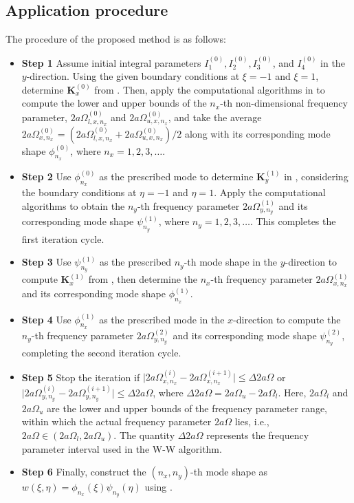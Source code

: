 \documentclass[preprint,12pt]{elsarticle}
\begin{document}
\subsection{Application procedure}\label{sec:Application procedure}
The procedure of the proposed method is as follows:   
\begin{itemize}[]
	\item \textbf{Step 1} Assume initial integral parameters $I^{(0)}_1, I^{(0)}_2, I^{(0)}_3$, and $I^{(0)}_4$ in the $y$-direction. Using the given boundary conditions at $\xi = -1$ and $\xi = 1$, determine $\mathbf{K}^{(0)}_x$ from . 
	Then, apply the computational algorithms in  to compute the lower and upper bounds of the $n_x$-th non-dimensional frequency parameter, $2a\Omega^{(0)}_{l,x,n_x}$ and $2a\Omega^{(0)}_{u,x,n_x}$, and take the average $2a\Omega^{(0)}_{x,n_x} = (2a\Omega^{(0)}_{l,x,n_x} + 2a\Omega^{(0)}_{u,x,n_x})/2$ along with its corresponding mode shape $\phi^{(0)}_{n_x}$, where $n_x = 1, 2, 3, \ldots$.
	
	\item \textbf{Step 2} Use $\phi^{(0)}_{n_x}$ as the prescribed mode to determine $\mathbf{K}^{(1)}_y$ in , considering the boundary conditions at $\eta = -1$ and $\eta = 1$. 
	Apply the computational algorithms to obtain the $n_y$-th frequency parameter $2a\Omega^{(1)}_{y,n_y}$ and its corresponding mode shape $\psi^{(1)}_{n_y}$, where $n_y = 1, 2, 3, \ldots$. This completes the first iteration cycle.  
	
	\item \textbf{Step 3} Use $\psi^{(1)}_{n_y}$ as the prescribed $n_y$-th mode shape in the $y$-direction to compute $\mathbf{K}^{(1)}_x$ from , then determine the $n_x$-th frequency parameter $2a\Omega^{(1)}_{x,n_x}$ and its corresponding mode shape $\phi^{(1)}_{n_x}$.  
	
	\item \textbf{Step 4} Use $\phi^{(1)}_{n_x}$ as the prescribed mode in the $x$-direction to compute the $n_y$-th frequency parameter $2a\Omega^{(2)}_{y,n_y}$ and its corresponding mode shape $\psi^{(2)}_{n_y}$, completing the second iteration cycle.  
	
	\item \textbf{Step 5} Stop the iteration if $\lvert 2a\Omega^{(i)}_{x,n_x} - 2a\Omega^{(i+1)}_{x,n_x} \rvert \leq \Delta 2a\Omega$ or $\lvert 2a\Omega^{(i)}_{y,n_y} - 2a\Omega^{(i+1)}_{y,n_y} \rvert \leq \Delta 2a\Omega$, where $\Delta 2a\Omega = 2a\Omega_u - 2a\Omega_l$. Here, $2a\Omega_l$ and $2a\Omega_u$ are the lower and upper bounds of the frequency parameter range, within which the actual frequency parameter $2a\Omega$ lies, i.e., $2a\Omega \in (2a\Omega_l, 2a\Omega_u)$. The quantity $\Delta 2a\Omega$ represents the frequency parameter interval used in the W-W algorithm.
	
	\item \textbf{Step 6} Finally, construct the $(n_x, n_y)$-th mode shape as $w(\xi, \eta) = \phi_{n_x}(\xi) \psi_{n_y}(\eta)$ using .  
\end{itemize}
\end{document}
